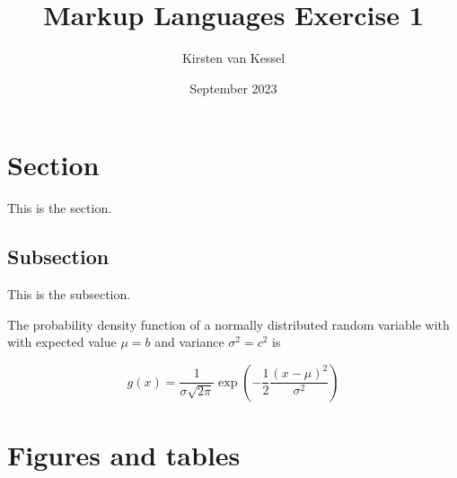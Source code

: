 \documentclass{article}
\title{Markup Languages Exercise 1}
\author{Kirsten van Kessel}
\date{September 2023}
\begin{document}
\maketitle
\newpage

\section{Section}

This is the section. 

\subsection{Subsection}

This is the subsection. 

The probability density function of a normally distributed random variable with with expected value \(\mu = b\) and variance \(\sigma^2 = c^2\) is

\[g(x) = \frac{1}{\sigma \sqrt{2\pi}}
\exp\left(-\frac{1}{2}\frac{(x-\mu)^2}{\sigma^2}\right) \]

\section{Figures and tables}
\end{document}
